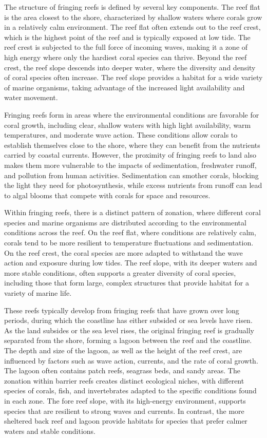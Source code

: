 The structure of fringing reefs is defined by several key components. The reef flat is the area closest to the shore, characterized by shallow waters where corals grow in a relatively calm environment. The reef flat often extends out to the reef crest, which is the highest point of the reef and is typically exposed at low tide. The reef crest is subjected to the full force of incoming waves, making it a zone of high energy where only the hardiest coral species can thrive. Beyond the reef crest, the reef slope descends into deeper water, where the diversity and density of coral species often increase. The reef slope provides a habitat for a wide variety of marine organisms, taking advantage of the increased light availability and water movement.

Fringing reefs form in areas where the environmental conditions are favorable for coral growth, including clear, shallow waters with high light availability, warm temperatures, and moderate wave action. These conditions allow corals to establish themselves close to the shore, where they can benefit from the nutrients carried by coastal currents. However, the proximity of fringing reefs to land also makes them more vulnerable to the impacts of sedimentation, freshwater runoff, and pollution from human activities. Sedimentation can smother corals, blocking the light they need for photosynthesis, while excess nutrients from runoff can lead to algal blooms that compete with corals for space and resources.

Within fringing reefs, there is a distinct pattern of zonation, where different coral species and marine organisms are distributed according to the environmental conditions across the reef. On the reef flat, where conditions are relatively calm, corals tend to be more resilient to temperature fluctuations and sedimentation. On the reef crest, the coral species are more adapted to withstand the wave action and exposure during low tides. The reef slope, with its deeper waters and more stable conditions, often supports a greater diversity of coral species, including those that form large, complex structures that provide habitat for a variety of marine life.

These reefs typically develop from fringing reefs that have grown over long periods, during which the coastline has either subsided or sea levels have risen. As the land subsides or the sea level rises, the original fringing reef is gradually separated from the shore, forming a lagoon between the reef and the coastline.
The depth and size of the lagoon, as well as the height of the reef crest, are influenced by factors such as wave action, currents, and the rate of coral growth. The lagoon often contains patch reefs, seagrass beds, and sandy areas. The zonation within barrier reefs creates distinct ecological niches, with different species of corals, fish, and invertebrates adapted to the specific conditions found in each zone. The fore reef slope, with its high-energy environment, supports species that are resilient to strong waves and currents. In contrast, the more sheltered back reef and lagoon provide habitats for species that prefer calmer waters and stable conditions.

